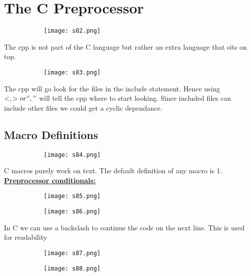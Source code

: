 \documentclass[8pt]{extreport}
\begin{document}
\section{ The C Preprocessor }
\begin{figure}[H]
\centering
\begin{subfigure}[b]{0.4\linewidth}
\texttt{[image: s82.png]}
\end{subfigure}
\end{figure}
The cpp is not part of the C language but rather an extra language that sits on top.
\begin{figure}[H]
\centering
\begin{subfigure}[b]{0.4\linewidth}
\texttt{[image: s83.png]}
\end{subfigure}
\end{figure}
The cpp will go look for the files in the include statement. Hence using $<,> or ","$ will tell the cpp where to start looking. Since included files can include other files we could get a cyclic dependance.

\subsection{Macro Definitions}
\begin{figure}[H]
\centering
\begin{subfigure}[b]{0.4\linewidth}
\texttt{[image: s84.png]}
\end{subfigure}
\end{figure}
C macros purely work on text. The default definition of any macro is 1.
\underline{\textbf{Preprocessor conditionals:}}
\begin{figure}[H]
\centering
\begin{subfigure}[b]{0.4\linewidth}
\texttt{[image: s85.png]}
\end{subfigure}
\begin{subfigure}[b]{0.4\linewidth}
\texttt{[image: s86.png]}
\end{subfigure}
\end{figure}
In C we can use a backslash to continue the code on the next line. This is used for readability
\begin{figure}[H]
\centering
\begin{subfigure}[b]{0.4\linewidth}
\texttt{[image: s87.png]}
\end{subfigure}
\begin{subfigure}[b]{0.4\linewidth}
\texttt{[image: s88.png]}
\end{subfigure}
\end{figure}
\end{document}
